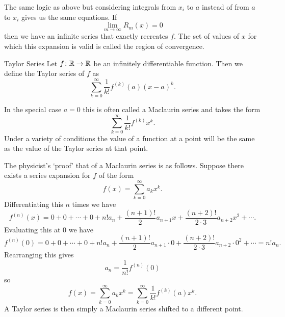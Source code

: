 \documentclass[a4paper]{article}
\begin{document}
    The same logic as above but considering integrals from \(x_i\) to \(a\) instead of from \(a\) to \(x_i\) gives us the same equations.
    If
    \[\lim_{m\to\infty} R_m(x) = 0\]
    then we have an infinite series that exactly recreates \(f\).
    The set of values of \(x\) for which this expansion is valid is called the region of convergence.
    \begin{definition}{Taylor Series}{}
        Let \(f\colon\mathbb{R}\to\mathbb{R}\) be an infinitely differentiable function.
        Then we define the Taylor series of \(f\) as
        \[\sum_{k=0}^{\infty} \frac{1}{k!}f^{(k)}(a)(x - a)^k.\]
    \end{definition}
    In the special case \(a = 0\) this is often called a Maclaurin series and takes the form
    \[\sum_{k=0}^{\infty} \frac{1}{k!}f^{(k)}x^k.\]
    Under a variety of conditions the value of a function at a point will be the same as the value of the Taylor series at that point.
    
    The physicist's `proof' that of a Maclaurin series is as follows.
    Suppose there exists a series expansion for \(f\) of the form
    \[f(x) = \sum_{k=0}^{\infty} a_kx^k.\]
    Differentiating this \(n\) times we have
    \[f^{(n)}(x) = 0 + 0 + \dotsb + 0 + n!a_n + \frac{(n+1)!}{2}a_{n+1}x + \frac{(n + 2)!}{2\cdot 3}a_{n+2}x^2 + \dotsb.\]
    Evaluating this at 0 we have
    \[f^{(n)}(0) = 0 + 0 + \dotsb + 0 + n!a_n + \frac{(n + 1)!}{2}a_{n + 1}\cdot0 + \frac{(n + 2)!}{2\cdot 3}a_{n + 2}\cdot 0^2 + \dotsb = n!a_n.\]
    Rearranging this gives
    \[a_n = \frac{1}{n!}f^{(n)}(0)\]
    so
    \[f(x) = \sum_{k=0}^{\infty} a_kx^k = \sum_{k=0}^{\infty} \frac{1}{k!}f^{(k)}(a)x^k.\]
    A Taylor series is then simply a Maclaurin series shifted to a different point.
    
\end{document}
